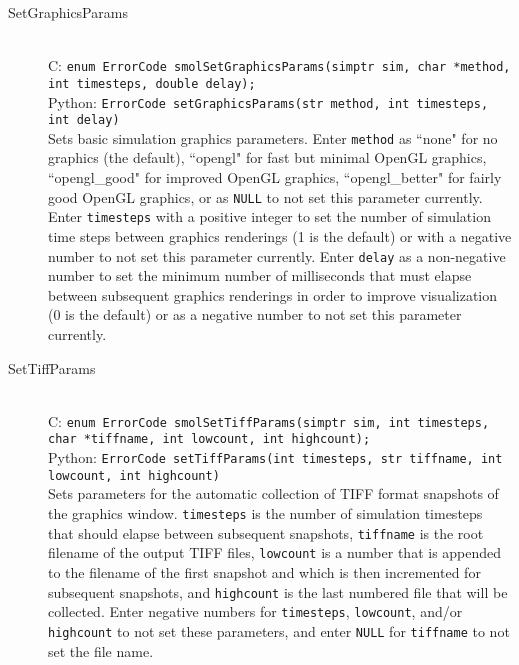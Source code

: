 \documentclass {book}
\begin{document}
\begin{description}

\item[SetGraphicsParams]
\hfill \\
C: \texttt{enum ErrorCode smolSetGraphicsParams(simptr sim, char *method, int timesteps, double delay);}\\
Python: \texttt{ErrorCode setGraphicsParams(str method, int timesteps, int delay)}\\
Sets basic simulation graphics parameters. Enter \texttt{method} as ``none" for no graphics (the default), ``opengl" for fast but minimal OpenGL graphics, ``opengl\_good" for improved OpenGL graphics, ``opengl\_better" for fairly good OpenGL graphics, or as \texttt{NULL} to not set this parameter currently. Enter \texttt{timesteps} with a positive integer to set the number of simulation time steps between graphics renderings (1 is the default) or with a negative number to not set this parameter currently. Enter \texttt{delay} as a non-negative number to set the minimum number of milliseconds that must elapse between subsequent graphics renderings in order to improve visualization (0 is the default) or as a negative number to not set this parameter currently.

\item[SetTiffParams]
\hfill \\
C: \texttt{enum ErrorCode smolSetTiffParams(simptr sim, int timesteps, char *tiffname, int lowcount, int highcount);}\\
Python: \texttt{ErrorCode setTiffParams(int timesteps, str tiffname, int lowcount, int highcount)}\\
Sets parameters for the automatic collection of TIFF format snapshots of the graphics window. \texttt{timesteps} is the number of simulation timesteps that should elapse between subsequent snapshots, \texttt{tiffname} is the root filename of the output TIFF files, \texttt{lowcount} is a number that is appended to the filename of the first snapshot and which is then incremented for subsequent snapshots, and \texttt{highcount} is the last numbered file that will be collected. Enter negative numbers for \texttt{timesteps}, \texttt{lowcount}, and/or \texttt{highcount} to not set these parameters, and enter \texttt{NULL} for \texttt{tiffname} to not set the file name.


\end{description}
\end{document}

